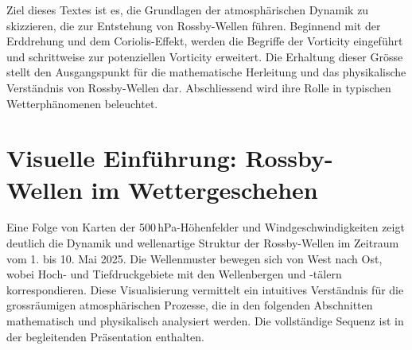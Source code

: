 \begin{refsection}
    Ziel dieses Textes ist es, die Grundlagen der atmosphärischen Dynamik zu skizzieren, die zur Entstehung von Rossby-Wellen führen.  
    Beginnend mit der Erddrehung und dem Coriolis-Effekt, werden die Begriffe der Vorticity eingeführt und schrittweise zur potenziellen Vorticity erweitert.  
    Die Erhaltung dieser Grösse stellt den Ausgangspunkt für die mathematische Herleitung und das physikalische Verständnis von Rossby-Wellen dar.  
    Abschliessend wird ihre Rolle in typischen Wetterphänomenen beleuchtet.  
    

    \section{Visuelle Einführung: Rossby-Wellen im Wettergeschehen}

    Eine Folge von Karten der 500\,hPa-Höhenfelder und Windgeschwindigkeiten zeigt deutlich die Dynamik und wellenartige Struktur der Rossby-Wellen im Zeitraum vom 1. bis 10. Mai 2025.  
    Die Wellenmuster bewegen sich von West nach Ost, wobei Hoch- und Tiefdruckgebiete mit den Wellenbergen und -tälern korrespondieren.  
    Diese Visualisierung vermittelt ein intuitives Verständnis für die grossräumigen atmosphärischen Prozesse, die in den folgenden Abschnitten mathematisch und physikalisch analysiert werden.  
    Die vollständige Sequenz ist in der begleitenden Präsentation enthalten.  



\end{refsection}
